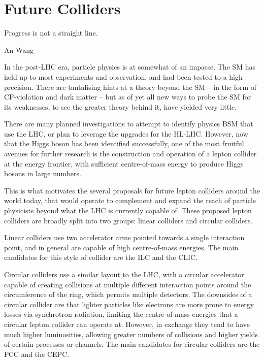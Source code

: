 \chapter{Future Colliders}
\label{chapter:colliders}

\epigraph{Progress is not a straight line.}{An Wang}

In the post-LHC era, particle physics is at somewhat of an impasse. The \acrfull{SM} has held up to most experiments and observation, and had been tested to a high precision. There are tantalising hints at a theory beyond the \acrlong{SM} -- in the form of CP-violation and dark matter -- but as of yet all new ways to probe the \acrshort{SM} for its weaknesses, to see the greater theory behind it, have yielded very little. 

There are many planned investigations to attempt to identify physics \acrlong{BSM} that use the \acrfull{LHC}, or plan to leverage the upgrades for the \acrfull{HL-LHC}. However, now that the Higgs boson has been identified successfully, one of the most fruitful avenues for further research is the construction and operation of a lepton collider at the energy frontier, with sufficient centre-of-mass energy to produce Higgs bosons in large numbers.

This is what motivates the several proposals for future lepton colliders around the world today, that would operate to complement and expand the reach of particle physicists beyond what the \acrshort{LHC} is currently capable of. These proposed lepton colliders are broadly split into two groups: linear colliders and circular colliders. 

Linear colliders use two accelerator arms pointed towards a single interaction point, and in general are capable of high centre-of-mass energies. The main candidates for this style of collider are the \acrfull{ILC} and the \acrfull{CLIC}. 

Circular colliders use a similar layout to the \acrshort{LHC}, with a circular accelerator capable of creating collisions at multiple different interaction points around the circumference of the ring, which permits multiple detectors. The downsides of a circular collider are that lighter particles like electrons are more prone to energy losses via synchrotron radiation, limiting the centre-of-mass energies that a circular lepton collider can operate at. However, in exchange they tend to have much higher luminosities, allowing greater numbers of collisions and higher yields of certain processes or channels. The main candidates for circular colliders are the \acrfull{FCC} and the \acrfull{CEPC}. 

